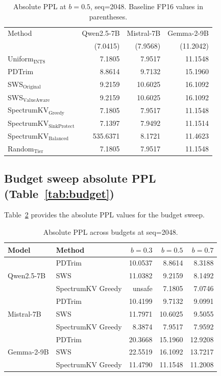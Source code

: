 \documentclass[11pt]{article}
\newcommand{\method}{SpectrumKV}
\newcommand{\budget}{b}
\theoremstyle{plain}
\theoremstyle{definition}
\begin{document}
\begin{table}[H]
\centering
\caption{Absolute PPL at $\budget=0.5$, seq=2048.  Baseline FP16 values in parentheses.}
\label{tab:ppl50-raw}
\small
\begin{tabular}{lrrr}
\toprule
Method & Qwen2.5-7B & Mistral-7B & Gemma-2-9B \\
 & (7.0415) & (7.9568) & (11.2042) \\
\midrule
Uniform$_{\text{INT8}}$ & 7.1805 & 7.9517 & 11.1548 \\
PDTrim & 8.8614 & 9.7132 & 15.1960 \\
SWS$_{\text{Original}}$ & 9.2159 & 10.6025 & 16.1092 \\
SWS$_{\text{ValueAware}}$ & 9.2159 & 10.6025 & 16.1092 \\
\method{}$_{\text{Greedy}}$ & 7.1805 & 7.9517 & 11.1548 \\
\method{}$_{\text{SinkProtect}}$ & 7.1397 & 7.9492 & 11.1514 \\
\method{}$_{\text{Balanced}}$ & 535.6371 & 8.1721 & 11.4623 \\
Random$_{\text{Tier}}$ & 7.1805 & 7.9517 & 11.1548 \\
\bottomrule
\end{tabular}
\end{table}

\subsection{Budget sweep absolute PPL (Table~\ref{tab:budget})}

Table~\ref{tab:budget-raw} provides the absolute PPL values for the budget sweep.

\begin{table}[H]
\centering
\caption{Absolute PPL across budgets at seq=2048.}
\label{tab:budget-raw}
\small
\begin{tabular}{llrrr}
\toprule
Model & Method & $\budget=0.3$ & $\budget=0.5$ & $\budget=0.7$ \\
\midrule
\multirow{3}{*}{Qwen2.5-7B}
  & PDTrim & 10.0537 & 8.8614 & 8.3188 \\
  & SWS & 11.0382 & 9.2159 & 8.1492 \\
  & \method{} Greedy & unsafe & 7.1805 & 7.0746 \\
\midrule
\multirow{3}{*}{Mistral-7B}
  & PDTrim & 10.4199 & 9.7132 & 9.0991 \\
  & SWS & 11.7971 & 10.6025 & 9.5055 \\
  & \method{} Greedy & 8.3874 & 7.9517 & 7.9592 \\
\midrule
\multirow{3}{*}{Gemma-2-9B}
  & PDTrim & 20.3668 & 15.1960 & 12.9208 \\
  & SWS & 22.5519 & 16.1092 & 13.7217 \\
  & \method{} Greedy & 11.4790 & 11.1548 & 11.2008 \\
\bottomrule
\end{tabular}
\end{table}
\end{document}
